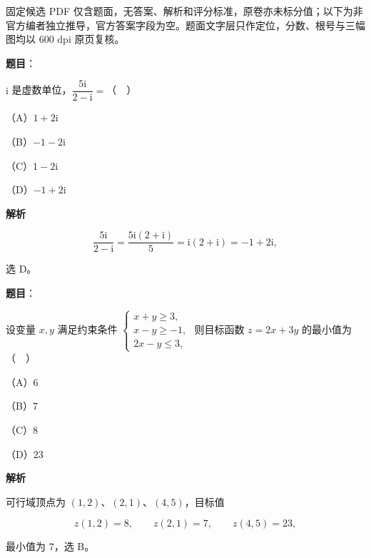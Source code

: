 

\begin{gktip}
固定候选 PDF 仅含题面，无答案、解析和评分标准，原卷亦未标分值；以下为非官方编者独立推导，官方答案字段为空。题面文字层只作定位，分数、根号与三幅图均以 600 dpi 原页复核。
\end{gktip}

\begin{answer}

\textbf{题目}：

$\mathrm i$ 是虚数单位，$\dfrac{5\mathrm i}{2-\mathrm i}=$（　）

（A）$1+2\mathrm i$

（B）$-1-2\mathrm i$

（C）$1-2\mathrm i$

（D）$-1+2\mathrm i$

\textbf{解析}

\nopagebreak[4]
\[\frac{5\mathrm i}{2-\mathrm i}
=\frac{5\mathrm i(2+\mathrm i)}{5}
=\mathrm i(2+\mathrm i)=-1+2\mathrm i,\]

选 D。


\end{answer}
\begin{answer}

\textbf{题目}：

设变量 $x,y$ 满足约束条件 $\begin{cases}x+y\geqslant3,\\ x-y\geqslant-1,\\ 2x-y\leqslant3,\end{cases}$ 则目标函数 $z=2x+3y$ 的最小值为（　）

（A）$6$

（B）$7$

（C）$8$

（D）$23$

\textbf{解析}

可行域顶点为 $(1,2)$、$(2,1)$、$(4,5)$，目标值

\nopagebreak[4]
\[z(1,2)=8,\qquad z(2,1)=7,\qquad z(4,5)=23,\]

最小值为 $7$，选 B。


\end{answer}
